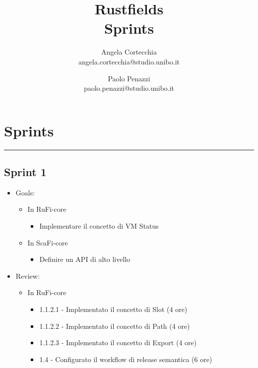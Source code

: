 \documentclass[12pt, a4paper]{article}
\title{\LARGE
    Rustfields \\ 
    \small
    Sprints
    }
\author{
    Angela Cortecchia \\ 
    \small 
    angela.cortecchia@studio.unibo.it
    \and
    Paolo Penazzi \\ 
    \small
    paolo.penazzi@studio.unibo.it
}
\date{\small }
\begin{document}
\maketitle
\newpage

\section*{Sprints}

\par\noindent\rule{\textwidth}{0.5pt}

\subsection*{Sprint 1}

\begin{itemize}
    \item Goals:
          \begin{itemize}
              \color{teal}
              \item In RuFi-core
                    \begin{itemize}
                        \item Implementare il concetto di VM Status
                    \end{itemize}
                    \color{cyan}
              \item In ScaFi-core
                    \begin{itemize}
                        \item Definire un API di alto livello
                    \end{itemize}
          \end{itemize}
    \item Review:
          \begin{itemize}
              \color{teal}
              \item In RuFi-core
                    \begin{itemize}
                        \item 1.1.2.1 - Implementato il concetto di Slot (4 ore)
                        \item 1.1.2.2 - Implementato il concetto di Path (4 ore)
                        \item 1.1.2.3 - Implementato il concetto di Export (4 ore)
                        \item 1.4 - Configurato il workflow di release semantica (6 ore)
                    \end{itemize}

\end{itemize}
\end{itemize}
\end{document}
